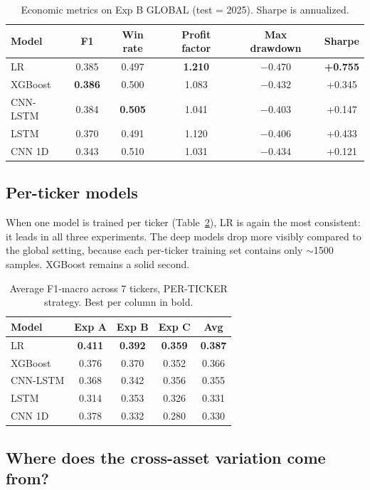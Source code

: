 \documentclass[runningheads]{llncs}
\begin{document}
\begin{table}[t]
\centering
\small
\caption{Economic metrics on Exp B GLOBAL (test = 2025). Sharpe is annualized.}
\label{tab:econ_B}
\begin{tabular}{lccccc}
\toprule
Model & F1 & Win rate & Profit factor & Max drawdown & Sharpe \\
\midrule
LR & 0.385 & 0.497 & \textbf{1.210} & $-0.470$ & \textbf{+0.755} \\
XGBoost & \textbf{0.386} & 0.500 & 1.083 & $-0.432$ & +0.345 \\
CNN-LSTM & 0.384 & \textbf{0.505} & 1.041 & \textbf{$-0.403$} & +0.147 \\
LSTM & 0.370 & 0.491 & 1.120 & $-0.406$ & +0.433 \\
CNN 1D & 0.343 & 0.510 & 1.031 & $-0.434$ & +0.121 \\
\bottomrule
\end{tabular}
\end{table}

\subsection{Per-ticker models}

When one model is trained per ticker (Table~\ref{tab:f1_pt}), LR is again the most consistent: it leads in all three experiments. The deep models drop more visibly compared to the global setting, because each per-ticker training set contains only $\sim$1500 samples. XGBoost remains a solid second.

\begin{table}[t]
\centering
\caption{Average F1-macro across 7 tickers, PER-TICKER strategy. Best per column in bold.}
\label{tab:f1_pt}
\begin{tabular}{lcccc}
\toprule
Model & Exp A & Exp B & Exp C & Avg \\
\midrule
LR & \textbf{0.411} & \textbf{0.392} & \textbf{0.359} & \textbf{0.387} \\
XGBoost & 0.376 & 0.370 & 0.352 & 0.366 \\
CNN-LSTM & 0.368 & 0.342 & 0.356 & 0.355 \\
LSTM & 0.314 & 0.353 & 0.326 & 0.331 \\
CNN 1D & 0.378 & 0.332 & 0.280 & 0.330 \\
\bottomrule
\end{tabular}
\end{table}

\subsection{Where does the cross-asset variation come from?}
\label{sec:crossasset}
\end{document}
